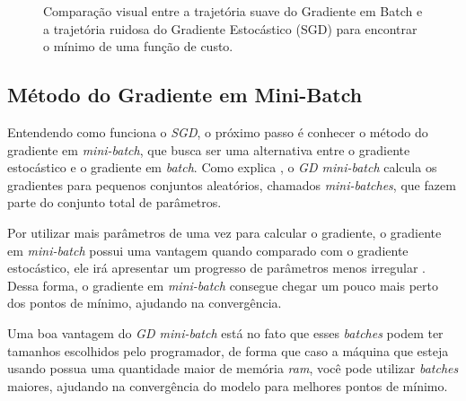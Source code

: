 \begin{figure}[h!]
    \caption{Comparação visual entre a trajetória suave do Gradiente em Batch e a trajetória ruidosa do Gradiente Estocástico (SGD) para encontrar o mínimo de uma função de custo.}
    \label{fig:comparativo-gd-sgd}
\end{figure}

\subsection{Método do Gradiente em Mini-Batch}

Entendendo como funciona o \textit{SGD}, o próximo passo é conhecer o método do gradiente em \textit{mini-batch}, que busca ser uma alternativa entre o gradiente estocástico e o gradiente em \textit{batch}. Como explica \textcite{MaosAObra}, o \textit{GD mini-batch} calcula os gradientes para pequenos conjuntos aleatórios, chamados \textit{mini-batches}, que fazem parte do conjunto total de parâmetros.

Por utilizar mais parâmetros de uma vez para calcular o gradiente, o gradiente em \textit{mini-batch} possui uma vantagem quando comparado com o gradiente estocástico, ele irá apresentar um progresso de parâmetros menos irregular \parencite{MaosAObra}. Dessa forma, o gradiente em \textit{mini-batch} consegue chegar um pouco mais perto dos pontos de mínimo, ajudando na convergência.

Uma boa vantagem do \textit{GD mini-batch} está no fato que esses \textit{batches} podem ter tamanhos escolhidos pelo programador, de forma que caso a máquina que esteja usando possua uma quantidade maior de memória \textit{ram}, você pode utilizar \textit{batches} maiores, ajudando na convergência do modelo para melhores pontos de mínimo.

